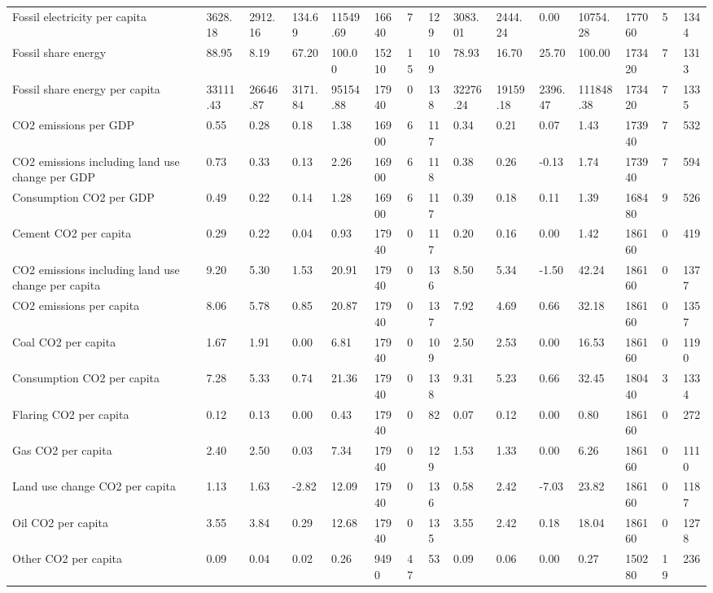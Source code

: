 \begin{longtable}{lllllllllllllll}
\addlinespace
Fossil electricity per capita & 3628.18 & 2912.16 & 134.69 & 11549.69 & 16640 & 7 & 129 & 3083.01 & 2444.24 & 0.00 & 10754.28 & 177060 & 5 & 1344\\
Fossil share energy & 88.95 & 8.19 & 67.20 & 100.00 & 15210 & 15 & 109 & 78.93 & 16.70 & 25.70 & 100.00 & 173420 & 7 & 1313\\
Fossil share energy per capita & 33111.43 & 26646.87 & 3171.84 & 95154.88 & 17940 & 0 & 138 & 32276.24 & 19159.18 & 2396.47 & 111848.38 & 173420 & 7 & 1335\\
CO2 emissions per GDP & 0.55 & 0.28 & 0.18 & 1.38 & 16900 & 6 & 117 & 0.34 & 0.21 & 0.07 & 1.43 & 173940 & 7 & 532\\
CO2 emissions including land use change per GDP & 0.73 & 0.33 & 0.13 & 2.26 & 16900 & 6 & 118 & 0.38 & 0.26 & -0.13 & 1.74 & 173940 & 7 & 594\\
\addlinespace
Consumption CO2 per GDP & 0.49 & 0.22 & 0.14 & 1.28 & 16900 & 6 & 117 & 0.39 & 0.18 & 0.11 & 1.39 & 168480 & 9 & 526\\
Cement CO2 per capita & 0.29 & 0.22 & 0.04 & 0.93 & 17940 & 0 & 117 & 0.20 & 0.16 & 0.00 & 1.42 & 186160 & 0 & 419\\
CO2 emissions including land use change per capita & 9.20 & 5.30 & 1.53 & 20.91 & 17940 & 0 & 136 & 8.50 & 5.34 & -1.50 & 42.24 & 186160 & 0 & 1377\\
CO2 emissions per capita & 8.06 & 5.78 & 0.85 & 20.87 & 17940 & 0 & 137 & 7.92 & 4.69 & 0.66 & 32.18 & 186160 & 0 & 1357\\
Coal CO2 per capita & 1.67 & 1.91 & 0.00 & 6.81 & 17940 & 0 & 109 & 2.50 & 2.53 & 0.00 & 16.53 & 186160 & 0 & 1190\\
\addlinespace
Consumption CO2 per capita & 7.28 & 5.33 & 0.74 & 21.36 & 17940 & 0 & 138 & 9.31 & 5.23 & 0.66 & 32.45 & 180440 & 3 & 1334\\
Flaring CO2 per capita & 0.12 & 0.13 & 0.00 & 0.43 & 17940 & 0 & 82 & 0.07 & 0.12 & 0.00 & 0.80 & 186160 & 0 & 272\\
Gas CO2 per capita & 2.40 & 2.50 & 0.03 & 7.34 & 17940 & 0 & 129 & 1.53 & 1.33 & 0.00 & 6.26 & 186160 & 0 & 1110\\
Land use change CO2 per capita & 1.13 & 1.63 & -2.82 & 12.09 & 17940 & 0 & 136 & 0.58 & 2.42 & -7.03 & 23.82 & 186160 & 0 & 1187\\
Oil CO2 per capita & 3.55 & 3.84 & 0.29 & 12.68 & 17940 & 0 & 135 & 3.55 & 2.42 & 0.18 & 18.04 & 186160 & 0 & 1278\\
\addlinespace
Other CO2 per capita & 0.09 & 0.04 & 0.02 & 0.26 & 9490 & 47 & 53 & 0.09 & 0.06 & 0.00 & 0.27 & 150280 & 19 & 236\\

\end{longtable}
